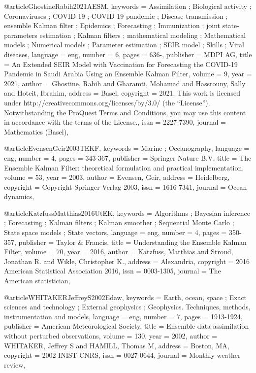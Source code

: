 @article{GhostineRabih2021AESM,
keywords = {Assimilation ; Biological activity ; Coronaviruses ; COVID-19 ; COVID-19 pandemic ; Disease transmission ; ensemble Kalman filter ; Epidemics ; Forecasting ; Immunization ; joint state-parameters estimation ; Kalman filters ; mathematical modeling ; Mathematical models ; Numerical models ; Parameter estimation ; SEIR model ; Skills ; Viral diseases},
language = {eng},
number = {6},
pages = {636-},
publisher = {MDPI AG},
title = {An Extended SEIR Model with Vaccination for Forecasting the COVID-19 Pandemic in Saudi Arabia Using an Ensemble Kalman Filter},
volume = {9},
year = {2021},
author = {Ghostine, Rabih and Gharamti, Mohamad and Hassrouny, Sally and Hoteit, Ibrahim},
address = {Basel},
copyright = {2021. This work is licensed under http://creativecommons.org/licenses/by/3.0/ (the “License”). Notwithstanding the ProQuest Terms and Conditions, you may use this content in accordance with the terms of the License.},
issn = {2227-7390},
journal = {Mathematics (Basel)},
}

@article{EvensenGeir2003TEKF,
keywords = {Marine ; Oceanography},
language = {eng},
number = {4},
pages = {343-367},
publisher = {Springer Nature B.V},
title = {The Ensemble Kalman Filter: theoretical formulation and practical implementation},
volume = {53},
year = {2003},
author = {Evensen, Geir},
address = {Heidelberg},
copyright = {Copyright Springer-Verlag 2003},
issn = {1616-7341},
journal = {Ocean dynamics},
}

@article{KatzfussMatthias2016UtEK,
keywords = {Algorithms ; Bayesian inference ; Forecasting ; Kalman filters ; Kalman smoother ; Sequential Monte Carlo ; State space models ; State vectors},
language = {eng},
number = {4},
pages = {350-357},
publisher = {Taylor & Francis},
title = {Understanding the Ensemble Kalman Filter},
volume = {70},
year = {2016},
author = {Katzfuss, Matthias and Stroud, Jonathan R. and Wikle, Christopher K.},
address = {Alexandria},
copyright = {2016 American Statistical Association 2016},
issn = {0003-1305},
journal = {The American statistician},
}

@article{WHITAKERJeffreyS2002Edaw,
keywords = {Earth, ocean, space ; Exact sciences and technology ; External geophysics ; Geophysics. Techniques, methods, instrumentation and models},
language = {eng},
number = {7},
pages = {1913-1924},
publisher = {American Meteorological Society},
title = {Ensemble data assimilation without perturbed observations},
volume = {130},
year = {2002},
author = {WHITAKER, Jeffrey S and HAMILL, Thomas M},
address = {Boston, MA},
copyright = {2002 INIST-CNRS},
issn = {0027-0644},
journal = {Monthly weather review},
}


